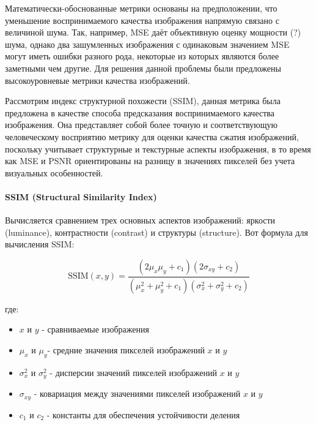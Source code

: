 Математически-обоснованные метрики основаны на предположении, что уменьшение
воспринимаемого качества изображения напрямую связано с величиной шума. Так,
например, MSE даёт объективную оценку мощности (?) шума, однако два зашумленных
изображения с одинаковым значением MSE могут иметь ошибки разного рода,
некоторые из которых являются более заметными чем другие. Для решения данной
проблемы были предложены высокоуровневые метрики качества изображений.



Рассмотрим индекс структурной похожести (SSIM), данная метрика была предложена в
качестве способа предсказания воспринимаемого качества изображения. Она
представляет собой более точную и соответствующую человеческому восприятию
метрику для оценки качества сжатия изображений, поскольку учитывает структурные
и текстурные аспекты изображения, в то время как MSE и PSNR ориентированы на
разницу в значениях пикселей без учета визуальных особенностей.


\paragraph{SSIM (Structural Similarity Index)}

Вычисляется сравнением трех основных аспектов изображений: яркости (luminance),
контрастности (contrast) и структуры (structure). Вот формула для вычисления
SSIM:

\begin{equation} \label{eq:img_ssim}
    \text{SSIM}\left(x, y\right) = \frac{
        \left(2\mu_{x}\mu_{y} + c_{1}\right)\left(2\sigma_{xy} + c_{2}\right)
    }{
        \left(\mu_{x}^{2} + \mu_{y}^2 + c_{1}\right)\left(\sigma_{x}^{2} + \sigma_{y}^{2} + c_{2}\right)
    }
\end{equation}

\noindent где:

\begin{itemize}
    \item $x$ и $y$ - сравниваемые изображения
    \item $\mu_{x}$ и $\mu_{y}$​ - средние значения пикселей изображений $x$ и $y$
    \item $\sigma_{x}^{2}$ и $\sigma_{y}^{2}$ - дисперсии значений пикселей изображений $x$ и $y$
    \item $\sigma_{xy}$ - ковариация между значениями пикселей изображений $x$ и $y$
    \item $c_{1}$ и $c_{2}$ - константы для обеспечения устойчивости деления
\end{itemize}

